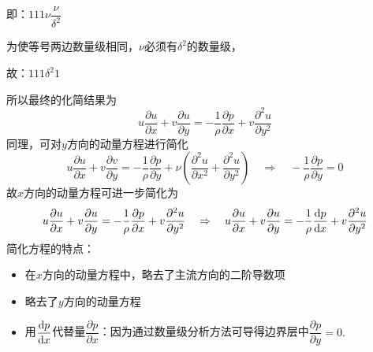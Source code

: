 \begin{enumerate}[\hspace*{2em} (1)]
	即：\hspace*{4.5cm}$1$\hspace*{0.8cm}$ 1$\hspace*{1.2cm}$1$\hspace*{1cm}$\nu$\hspace*{1cm}$\dfrac{\nu}{\delta^2}$
	
	为使等号两边数量级相同，$\nu$必须有$\delta^2$的数量级，
	
	故：\hspace*{4.5cm}$1$\hspace*{0.8cm}$ 1$\hspace*{1.2cm}$1$\hspace*{0.95cm}$\delta^2$\hspace*{1cm}$1$
	
	所以最终的化简结果为
	\begin{equation}
		u \dfrac{\partial u}{\partial x} + v \dfrac{\partial u}{\partial y} = - \dfrac{1}{\rho} \dfrac{\partial p}{\partial x} + v \dfrac{\partial^2 u}{\partial y^2}
	\end{equation}
	同理，可对$y$方向的动量方程进行简化
	\begin{equation}
		u\dfrac{\partial u}{\partial x} + v \dfrac{\partial v}{\partial y} = - \dfrac{1}{\rho} \dfrac{\partial p}{\partial y} + \nu \left(\dfrac{\partial^2 u}{\partial x^2} + \dfrac{\partial^2 u}{\partial y^2}\right) \quad \Rightarrow \quad - \dfrac{1}{\rho}\dfrac{\partial p}{\partial y} = 0
	\end{equation}
	故$x$方向的动量方程可进一步简化为
	\begin{equation}
		u \dfrac{\partial u}{\partial x} + v \dfrac{\partial u}{\partial y} = - \dfrac{1}{\rho} \dfrac{\partial p}{\partial x} + v \dfrac{\partial^2 u}{\partial y^2} \quad \Rightarrow \quad u \dfrac{\partial u}{\partial x} + v \dfrac{\partial u}{\partial y} = - \dfrac{1}{\rho} \dfrac{{\rm{d}} p}{{\rm{d}} x} + v \dfrac{\partial^2 u}{\partial y^2}
	\end{equation}
	\clearpage
	简化方程的特点：
	\begin{itemize}
		\item 在$x$方向的动量方程中，略去了主流方向的二阶导数项
		\item 略去了$y$方向的动量方程
		\item 用$\dfrac{{\rm{d}} p}{{\rm{d}} x}$代替量$\dfrac{\partial p}{\partial x}$：因为通过数量级分析方法可导得边界层中$\dfrac{\partial p}{\partial y} = 0.$
	\end{itemize}
\end{enumerate}

